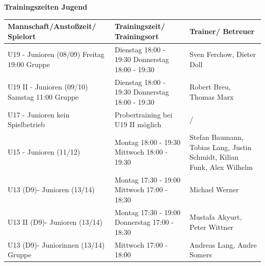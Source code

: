 
\begin{center}
    {
        \color{VereinsRot} \huge \textbf{Trainingszeiten Jugend}
    }
    
    \normalsize \RedStripes
\end{center}

\begin{table}[h!]
\centering
\renewcommand{\arraystretch}{1.5}
\begin{tabular}{|p{6cm}|p{6cm}|p{6cm}|}
\hline
\textbf{Mannschaft/Anstoßzeit/ Spielort} & \textbf{Trainingszeit/ Trainingsort} & \textbf{Trainer/ Betreuer} \\ \hline
U19 - Junioren (08/09) \newline Freitag 19:00 \newline Gruppe & Dienstag 18:00 - 19:30 \newline Donnerstag 18:00 - 19:30 & Sven Ferchow, Dieter Doll \\ \hline
U19 II - Junioren (09/10) \newline Samstag 11:00 \newline Gruppe & Dienstag 18:00 - 19:30 \newline Donnerstag 18:00 - 19:30 & Robert Breu, Thomas Marx \\ \hline
U17 - Junioren \newline kein Spielbetrieb & Probertraining bei U19 II möglich & / \\ \hline
U15 - Junioren (11/12) & Montag 18:00 - 19:30 \newline Mittwoch 18:00 - 19:30 & Stefan Baumann, Tobias Lang, Justin Schmidt, Kilian Funk, Alex Wilhelm \\ \hline
U13 (D9)- Junioren (13/14) & Montag 17:30 - 19:00 \newline Mittwoch 17:00 - 18:30 & Michael Werner \\ \hline
U13 II (D9)- Junioren (13/14) & Montag 17:30 - 19:00 \newline Donnerstag 17:00 - 18:30 & Mustafa Akyurt, Peter Wittner \\ \hline
U13 (D9)- Juniorinnen (13/14) \newline Gruppe & Mittwoch 17:00 - 18:00 & Andreas Lang, Andre Somers \\ \hline
\end{tabular}
\end{table}